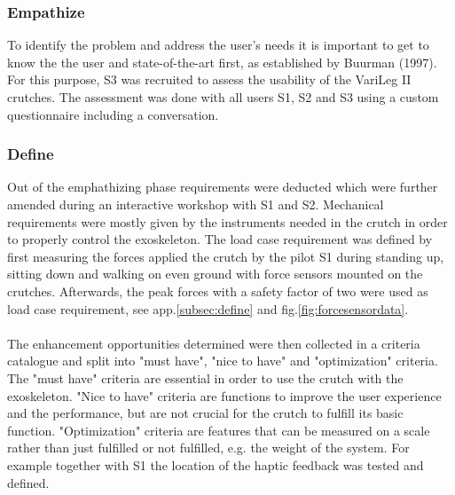 \documentclass[conference,a4paper]{IEEEtran}
\begin{document}

\subsubsection{Empathize}

To identify the problem and address the user's needs it is important to get to know the the user and state-of-the-art first, as established by Buurman (1997)\cite{buurmann1997}. For this purpose, S3 was recruited to assess the usability of the VariLeg II crutches. The assessment was done with all users S1, S2 and S3 using a custom questionnaire including a conversation.\\

\subsubsection{Define}
\label{sec:structure}

Out of the emphathizing phase requirements were deducted which were further amended during an interactive workshop with S1 and S2. 
Mechanical requirements were mostly given by the instruments needed in the crutch in order to properly control the exoskeleton. The load case requirement was defined by first measuring the forces applied the crutch by the pilot S1 during standing up, sitting down and walking on even ground with force sensors mounted on the crutches. Afterwards, the peak forces with a safety factor of two were used as load case requirement, see app.\ref{subsec:define} and fig.\ref{fig:forcesensordata}.  \\
\\
The enhancement opportunities determined were then collected in a criteria catalogue and split into "must have", "nice to have" and "optimization" criteria. The "must have" criteria are essential in order to use the crutch with the exoskeleton. "Nice to have" criteria are functions to improve the user experience and the performance, but are not crucial for the crutch to fulfill its basic function. "Optimization" criteria are features that can be measured on a scale rather than just fulfilled or not fulfilled, e.g. the weight of the system. For example together with S1 the location of the haptic feedback was tested and defined.\\
\end{document}
